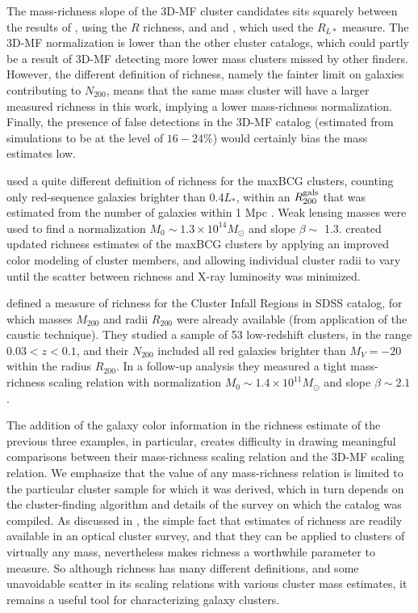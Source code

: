 The mass-richness slope of the \ac{3D-MF} cluster candidates sits squarely between the results of \citet{Wen09}, using the $R$ richness, and \citet{Wen12} and \citet{Covone14}, which used the $R_{L*}$ measure. The \ac{3D-MF} normalization is lower than the other cluster catalogs, which could partly be a result of \ac{3D-MF} detecting more lower mass clusters missed by other finders. However, the different definition of richness, namely the fainter limit on galaxies contributing to $N_{200}$, means that the same mass cluster will have a larger measured richness in this work, implying a lower mass-richness normalization. Finally, the presence of false detections in the \ac{3D-MF} catalog (estimated from simulations to be at the level of $16-24$\%) would certainly bias the mass estimates low.

\citet{Johnston07} used a quite different definition of richness for the maxBCG clusters, counting only red-sequence galaxies brighter than 0.4$L_*$, within an $R_{200}^{\rm gals}$ that was estimated from the number of galaxies within 1 Mpc \citep[following a prescription in][]{Hansen05}. Weak lensing masses were used to find a normalization $M_0 \sim 1.3 \times 10^{14} M_{\odot}$ and slope $\beta \sim$ 1.3. \citet{Rozo09b} created updated richness estimates of the maxBCG clusters by applying an improved color modeling of cluster members, and allowing individual cluster radii to vary until the scatter between richness and X-ray luminosity was minimized.

\citet{Andreon10} defined a measure of richness for the Cluster Infall Regions in SDSS catalog, for which masses $M_{200}$ and radii $R_{200}$ were already available (from application of the caustic technique). They studied a sample of 53 low-redshift clusters, in the range $0.03 < z < 0.1$, and their $N_{200}$ included all red galaxies brighter than $M_V = -20$ within the radius $R_{200}$. In a follow-up analysis they measured a tight mass-richness scaling relation with normalization $M_0 \sim 1.4 \times 10^{11} M_{\odot}$ and slope $\beta \sim 2.1$ \citep{Andreon12}.

The addition of the galaxy color information in the richness estimate of the previous three examples, in particular, creates difficulty in drawing meaningful comparisons between their mass-richness scaling relation and the \ac{3D-MF} scaling relation. We emphasize that the value of any mass-richness relation is limited to the particular cluster sample for which it was derived, which in turn depends on the cluster-finding algorithm and details of the survey on which the catalog was compiled. As discussed in \citet{Rozo09b}, the simple fact that estimates of richness are readily available in an optical cluster survey, and that they can be applied to clusters of virtually any mass, nevertheless makes richness a worthwhile parameter to measure. So although richness has many different definitions, and some unavoidable scatter in its scaling relations with various cluster mass estimates, it remains a useful tool for characterizing galaxy clusters. 

